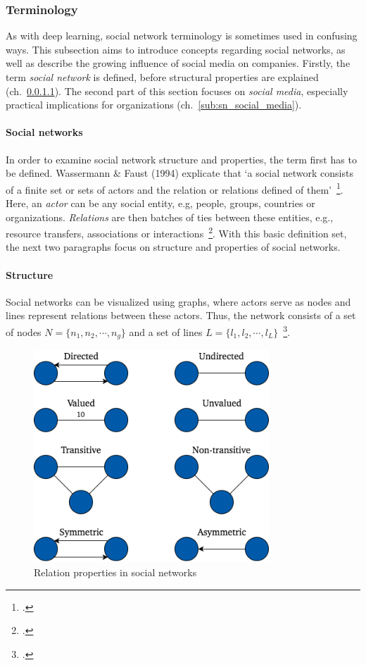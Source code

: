 \subsubsection{Terminology}
\label{sub:sn_terminology}

As with deep learning, social network terminology is sometimes used in confusing
ways.
This subsection aims to introduce concepts regarding social networks, as well
as describe the growing influence of social media on companies.
Firstly, the term \textit{social network} is defined, before structural
properties are explained (ch.~\ref{sub:sn_social_networks}).
The second part of this section focuses on \textit{social media}, especially
practical implications for organizations (ch.~\ref{sub:sn_social_media}).

\paragraph{Social networks}
\label{sub:sn_social_networks}

In order to examine social network structure and properties, the term first
has to be defined.
Wassermann \& Faust (1994) explicate that `a social network consists of a finite
set or sets of actors and the relation or relations defined of them'~\footcite[20]{Wasserman1994}.
Here, an \textit{actor} can be any social entity, e.g, people, groups, countries or
organizations.
\textit{Relations} are then batches of ties between these entities, e.g., resource
transfers, associations or interactions~\footcite{Wasserman1994}.
With this basic definition set, the next two paragraphs focus on structure and
properties of social networks.

\paragraph{Structure}

Social networks can be visualized using graphs, where actors serve as nodes
and lines represent relations between these actors.
Thus, the network consists of a set of nodes $N = \{n_1, n_2, \cdots, n_g\}$ and
a set of lines $L = \{l_1, l_2, \cdots, l_L\}$~\footcite{Wasserman1994}.

\begin{figure}[h]
  \centering
  \includegraphics[height=8cm]{img/relation_properties}
  \caption{Relation properties in social networks}
\label{fig:tie_properties}
\end{figure}

